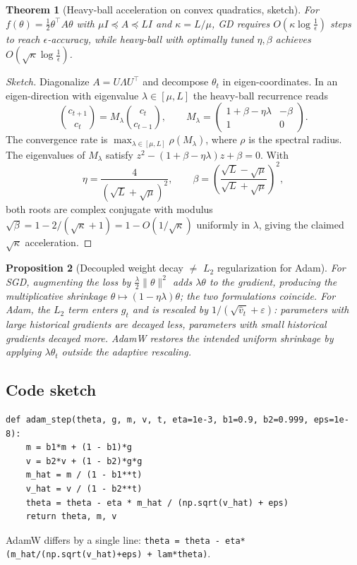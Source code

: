 \documentclass[11pt]{article}
\newtheorem{theorem}{Theorem}[section]
\newtheorem{proposition}[theorem]{Proposition}
\theoremstyle{remark}
\begin{document}
\begin{theorem}[Heavy-ball acceleration on convex quadratics, sketch]
For $f(\theta) = \tfrac{1}{2}\theta^\top A \theta$ with $\mu I \preceq A \preceq L I$ and $\kappa = L/\mu$, GD requires $O(\kappa \log \tfrac{1}{\epsilon})$ steps to reach $\epsilon$-accuracy, while heavy-ball with optimally tuned $\eta, \beta$ achieves $O(\sqrt{\kappa}\log \tfrac{1}{\epsilon})$.
\end{theorem}
\begin{proof}[Sketch]
Diagonalize $A = U\Lambda U^\top$ and decompose $\theta_t$ in eigen-coordinates. In an eigen-direction with eigenvalue $\lambda \in [\mu, L]$ the heavy-ball recurrence reads
\[
\binom{c_{t+1}}{c_t} = M_\lambda \binom{c_t}{c_{t-1}}, \qquad M_\lambda = \begin{pmatrix} 1 + \beta - \eta\lambda & -\beta \\ 1 & 0 \end{pmatrix}.
\]
The convergence rate is $\max_{\lambda \in [\mu, L]} \rho(M_\lambda)$, where $\rho$ is the spectral radius. The eigenvalues of $M_\lambda$ satisfy $z^2 - (1+\beta-\eta\lambda)z + \beta = 0$. With
\[
\eta = \frac{4}{(\sqrt{L}+\sqrt{\mu})^2}, \qquad \beta = \left(\frac{\sqrt{L}-\sqrt{\mu}}{\sqrt{L}+\sqrt{\mu}}\right)^2,
\]
both roots are complex conjugate with modulus $\sqrt{\beta} = 1 - 2/(\sqrt{\kappa}+1) = 1 - O(1/\sqrt{\kappa})$ uniformly in $\lambda$, giving the claimed $\sqrt{\kappa}$ acceleration.
\end{proof}

\begin{proposition}[Decoupled weight decay $\neq$ $L_2$ regularization for Adam]
For SGD, augmenting the loss by $\tfrac{\lambda}{2}\|\theta\|^2$ adds $\lambda\theta$ to the gradient, producing the multiplicative shrinkage $\theta \mapsto (1-\eta\lambda)\theta$; the two formulations coincide. For Adam, the $L_2$ term enters $g_t$ and is rescaled by $1/(\sqrt{\hat v_t}+\varepsilon)$: parameters with large historical gradients are decayed less, parameters with small historical gradients decayed more. AdamW restores the intended uniform shrinkage by applying $\lambda\theta_t$ outside the adaptive rescaling.
\end{proposition}

\subsection*{Code sketch}

\begin{verbatim}
def adam_step(theta, g, m, v, t, eta=1e-3, b1=0.9, b2=0.999, eps=1e-8):
    m = b1*m + (1 - b1)*g
    v = b2*v + (1 - b2)*g*g
    m_hat = m / (1 - b1**t)
    v_hat = v / (1 - b2**t)
    theta = theta - eta * m_hat / (np.sqrt(v_hat) + eps)
    return theta, m, v
\end{verbatim}
AdamW differs by a single line: \texttt{theta = theta - eta*(m\_hat/(np.sqrt(v\_hat)+eps) + lam*theta)}.
\end{document}
